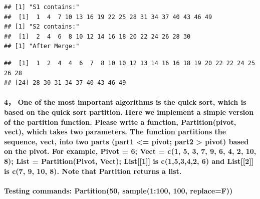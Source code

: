 \documentclass[]{article}
\let\oldparagraph\paragraph
\renewcommand{\paragraph}[1]{\oldparagraph{#1}\mbox{}}
\begin{document}
\begin{verbatim}
## [1] "S1 contains:"
##  [1]  1  4  7 10 13 16 19 22 25 28 31 34 37 40 43 46 49
## [1] "S2 contains:"
##  [1]  2  4  6  8 10 12 14 16 18 20 22 24 26 28 30
## [1] "After Merge:"
\end{verbatim}

\begin{verbatim}
##  [1]  1  2  4  4  6  7  8 10 10 12 13 14 16 16 18 19 20 22 22 24 25 26 28
## [24] 28 30 31 34 37 40 43 46 49
\end{verbatim}

\paragraph{4， One of the most important algorithms is the quick sort,
which is based on the quick sort partition. Here we implement a simple
version of the partition function. Please write a function,
Partition(pivot, vect), which takes two parameters. The function
partitions the sequence, vect, into two parts (part1 \textless{}= pivot;
part2 \textgreater{} pivot) based on the pivot. For example, Pivot = 6;
Vect = c(1, 5, 3, 7, 9, 6, 4, 2, 10, 8); List = Partition(Pivot, Vect);
List{[}{[}1{]}{]} is c(1,5,3,4,2, 6) and List{[}{[}2{]}{]} is c(7, 9,
10, 8). Note that Partition returns a
list.}\label{one-of-the-most-important-algorithms-is-the-quick-sort-which-is-based-on-the-quick-sort-partition.-here-we-implement-a-simple-version-of-the-partition-function.-please-write-a-function-partitionpivot-vect-which-takes-two-parameters.-the-function-partitions-the-sequence-vect-into-two-parts-part1-pivot-part2-pivot-based-on-the-pivot.-for-example-pivot-6-vect-c1-5-3-7-9-6-4-2-10-8-list-partitionpivot-vect-list1-is-c15342-6-and-list2-is-c7-9-10-8.-note-that-partition-returns-a-list.}

\paragraph{Testing commands: Partition(50, sample(1:100, 100,
replace=F))}\label{testing-commands-partition50-sample1100-100-replacef}
\end{document}
